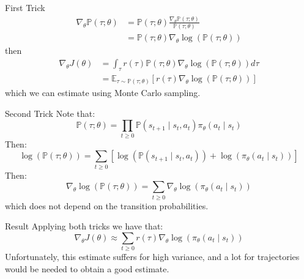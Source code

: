 \documentclass{beamer}
\begin{document}
	\begin{frame}
		\begin{block}{First Trick}
			\begin{align*}
			\nabla_\theta \mathbb{P}(\tau ; \theta) &= \mathbb{P}(\tau ; \theta) \frac{\nabla_\theta \mathbb{P}(\tau ; \theta)}{\mathbb{P}(\tau ; \theta)} \\
			&= \mathbb{P}(\tau ; \theta) \nabla_\theta \log \left( \mathbb{P}(\tau ; \theta) \right)
			\end{align*}
			then
			\begin{align*}
			\nabla_\theta J(\theta) &= \int_{\tau} r(\tau) \mathbb{P}(\tau ; \theta) \nabla_\theta \log \left( \mathbb{P}(\tau ; \theta) \right) d\tau \\
			&= \mathbb{E}_{\tau \sim \mathbb{P}(\tau ; \theta) } \left[ r(\tau) \nabla_\theta \log \left( \mathbb{P}(\tau ; \theta) \right) \right]
			\end{align*}
			which we can estimate using Monte Carlo sampling.
		\end{block}
	\end{frame}
	
	\begin{frame}
		\begin{block}{Second Trick}
			Note that:
			$$ \mathbb{P}(\tau ; \theta) = \prod_{t\geq0} \mathbb{P}(s_{t+1} \mid s_t, a_t) \pi_\theta (a_t \mid s_t) $$
			Then:
			$$ \log \left( \mathbb{P}(\tau ; \theta) \right) = \sum_{t\geq0} \left[  \log \left( \mathbb{P}(s_{t+1} \mid s_t, a_t) \right) + \log \left( \pi_\theta (a_t \mid s_t) \right) \right] $$
			Then:
			$$ \nabla_\theta \log \left( \mathbb{P}(\tau ; \theta) \right) = \sum_{t\geq0} \nabla_\theta \log \left( \pi_\theta (a_t \mid s_t) \right) $$
			which does not depend on the transition probabilities.
		\end{block}
	\end{frame}
	
	\begin{frame}
		\begin{block}{Result}
			Applying both tricks we have that:
			$$ \nabla_\theta J(\theta) \approx \sum_{t\geq0} r(\tau) \nabla_\theta \log \left( \pi_\theta (a_t \mid s_t) \right) $$
			Unfortunately, this estimate suffers for high variance, and a lot for trajectories would be needed to obtain a good estimate.
		\end{block}
	\end{frame}
	
\end{document}
